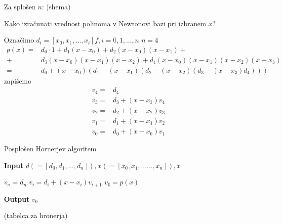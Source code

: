 \documentclass[a4paper,12pt]{article}
\theoremstyle{definition}
\theoremstyle{remark}
\begin{document}
Za splošen $n$:
(shema)

Kako izračunati vrednost polinoma v Newtonovi bazi pri izbranem $x$?

Označimo $d_i = [x_0, x_1, \dots, x_i] f, i = 0, 1, \dots, n$
$n = 4$
\begin{align*}
    p(x) =& d_0 \cdot 1 + d_1 (x-x_0) + d_2 (x-x_0)(x-x_1) + \\
         +& d_3 (x-x_0)(x-x_1)(x-x_2) + d_4 (x-x_0)(x-x_1)(x-x_2)(x-x_3) \\
         =& d_0 + (x-x_0)(d_1 - (x-x_1)(d_2 - (x-x_2)(d_3 - (x-x_3)d_4)))
\end{align*}
zapišemo
\begin{align*}
    v_4 =& d_4 \\
    v_3 =& d_3 + (x-x_3)v_4 \\
    v_2 =& d_2 + (x-x_2)v_3 \\
    v_1 =& d_1 + (x-x_1)v_2 \\
    v_0 =& d_0 + (x-x_0)v_1
\end{align*}



\begin{algorithm}
    \caption{Posplošen Hornerjev algoritem}\label{alg:horner}
    \hspace*{\algorithmicindent} \textbf{Input} $\underline{d} (= [d_0, d_1, \dots, d_n]), \underline{x}(= [x_0, x_1, \dots..., x_n]), x$
    \begin{algorithmic}
        \State $v_n = d_n$
            \State $v_i = d_i + (x-x_i) v_{i+1}$
        \EndFor
        \State $v_0 = p(x)$
    \end{algorithmic}
    \hspace*{\algorithmicindent} \textbf{Output} $v_0$
\end{algorithm}

(tabelca za hronerja)
\end{document}
